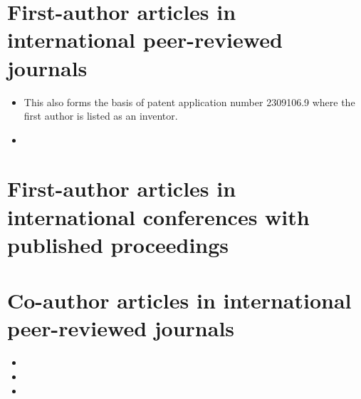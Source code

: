 \section*{First-author articles in international peer-reviewed journals}
\begin{itemize}
\item {} 

This also forms the basis of patent application number 2309106.9 where the first author is listed as an inventor.

\item {}
% 
\end{itemize}

\section*{First-author articles in international conferences with published proceedings}

\section*{Co-author articles in international peer-reviewed journals}
\begin{itemize}
\item {}

\item {}

\item {}
\end{itemize}
